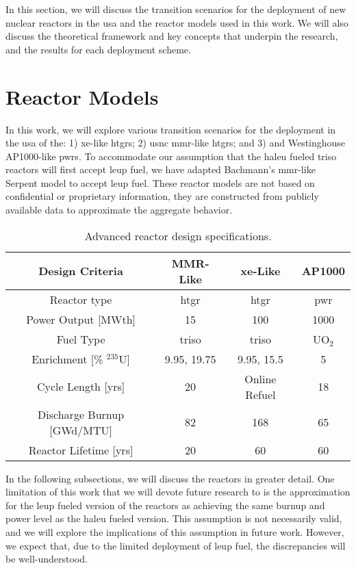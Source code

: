 In this section, we will discuss the transition scenarios for the deployment of new nuclear reactors in the \gls{usa} and the reactor models used in this work. We will also discuss the theoretical framework and key concepts that underpin the research, and the results for each deployment scheme.

\section{Reactor Models}
\label{sec:reactor_models}

In this work, we will explore various transition scenarios for the deployment in the \gls{usa} of the: 1) \gls{xe}-like \glspl{htgr}; 2) \gls{usnc} \gls{mmr}-like \glspl{htgr}; and 3) and Westinghouse AP1000-like \glspl{pwr}. To accommodate our assumption that the \gls{haleu} fueled \gls{triso} reactors will first accept \gls{leup} fuel, we have adapted Bachmann's \gls{mmr}-like Serpent model \cite{bachmann_mmr_like_2023} to accept \gls{leup} fuel. These reactor models are not based on confidential or proprietary information, they are constructed from publicly available data to approximate the aggregate behavior.

\begin{table}[htbp]
   \centering
   \caption{Advanced reactor design specifications.}
   \label{tab:ar_defs}
   \begin{tabular}{c c c c}
      \hline
      \textbf{Design Criteria} & \textbf{MMR-Like} \cite{usnc_design_2021} & \textbf{\gls{xe}-Like} \cite{nuscale_chapter_2018} & \textbf{AP1000} \\
      \hline
      Reactor type & \gls{htgr} & \gls{htgr} & \gls{pwr} \\
      Power Output [MWth] & 15 & 100 & 1000 \\
      Fuel Type & \gls{triso} & \gls{triso} & UO$_2$ \\
      Enrichment [\% $^{235}$U] & 9.95, 19.75 & 9.95, 15.5 & 5 \\
      Cycle Length [yrs] & 20 & Online Refuel & 18 \\
      Discharge Burnup [GWd/MTU] & 82 & 168 & 65 \\
      Reactor Lifetime [yrs] & 20 & 60 & 60 \\
      \hline
   \end{tabular}
\end{table}

In the following subsections, we will discuss the reactors in greater detail. One limitation of this work that we will devote future research to is the approximation for the \gls{leup} fueled version of the reactors as achieving the same burnup and power level as the \gls{haleu} fueled version. This assumption is not necessarily valid, and we will explore the implications of this assumption in future work. However, we expect that, due to the limited deployment of \gls{leup} fuel, the discrepancies will be well-understood.

